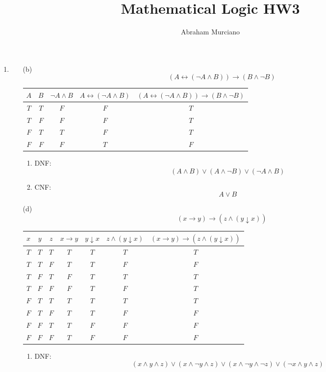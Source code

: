 \documentclass[fleqn]{article}
\title{Mathematical Logic HW3}
\author{Abraham Murciano}
\begin{document}
\maketitle

\begin{enumerate}

	\item %
	\begin{enumerate}
		\item[(b)]
		\[(A \leftrightarrow (\lnot A \land B)) \rightarrow (B \land \lnot B)\]
		\begin{tabular}{||c|c||c|c|c||}
			\hline
			\(A\) & \(B\) & \(\lnot A \land B\) & \(A \leftrightarrow (\lnot A \land B)\) & \((A \leftrightarrow (\lnot A \land B)) \rightarrow (B \land \lnot B)\) \\
			\hline
			\(T\) & \(T\) & \(F\) & \(F\) & \(T\) \\
			\(T\) & \(F\) & \(F\) & \(F\) & \(T\) \\
			\(F\) & \(T\) & \(T\) & \(F\) & \(T\) \\
			\(F\) & \(F\) & \(F\) & \(T\) & \(F\) \\
			\hline
		\end{tabular}
		\begin{enumerate}
			\item %
			DNF:
			\[(A \land B) \lor (A \land \lnot B) \lor (\lnot A \land B)\]

			\item %
			CNF:
			\[A \lor B\]
		\end{enumerate}

		\item[(d)]
		\[(x \rightarrow y) \rightarrow (z \land (y \downarrow x))\]
		\begin{tabular}{||c|c|c||c|c|c|c||}
			\hline
			\(x\) & \(y\) & \(z\) & \(x \rightarrow y\) & \(y \downarrow x\) & \(z \land (y \downarrow x)\) & \((x \rightarrow y) \rightarrow (z \land (y \downarrow x))\) \\
			\hline
			\(T\) & \(T\) & \(T\) & \(T\) & \(T\) & \(T\) & \(T\) \\
			\(T\) & \(T\) & \(F\) & \(T\) & \(T\) & \(F\) & \(F\) \\
			\(T\) & \(F\) & \(T\) & \(F\) & \(T\) & \(T\) & \(T\) \\
			\(T\) & \(F\) & \(F\) & \(F\) & \(T\) & \(F\) & \(T\) \\
			\(F\) & \(T\) & \(T\) & \(T\) & \(T\) & \(T\) & \(T\) \\
			\(F\) & \(T\) & \(F\) & \(T\) & \(T\) & \(F\) & \(F\) \\
			\(F\) & \(F\) & \(T\) & \(T\) & \(F\) & \(F\) & \(F\) \\
			\(F\) & \(F\) & \(F\) & \(T\) & \(F\) & \(F\) & \(F\) \\
			\hline
		\end{tabular}
		\begin{enumerate}
			\item %
			DNF:
			\[(x \land y \land z) \lor (x \land \lnot y \land z) \lor (x \land \lnot y \land \lnot z) \lor (\lnot x \land y \land z)\]


\end{enumerate}
\end{enumerate}
\end{enumerate}
\end{document}
